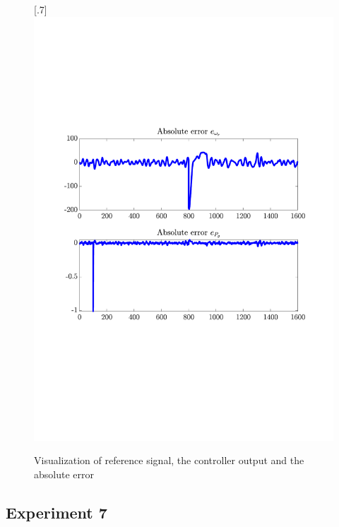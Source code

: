 \begin{figure}[H]
[.7\textwidth]{\includegraphics[width=1\linewidth, scale=1, trim=55 230 55 120,clip]{fig/Open_loop/exp_6_error.pdf}}
    \caption{Visualization of reference signal, the controller output and the absolute error}
    \label{fig:app:cl_results:exp6}
\end{figure}

\subsection{Experiment 7}

